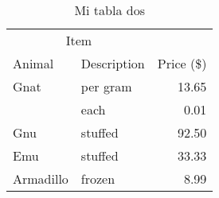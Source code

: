 \lipsum[1-1] \cite{latex2e}

\begin{table}[H]
    \centering
    \begin{tabular}{@{}llr@{}}
        \toprule
        \multicolumn{2}{c}{Item} &                          \\ \cmidrule(r){1-2}
        Animal                   & Description & Price (\$) \\ \midrule
        Gnat                     & per gram    & 13.65      \\
                                 & each        & 0.01       \\
        Gnu                      & stuffed     & 92.50      \\
        Emu                      & stuffed     & 33.33      \\
        Armadillo                & frozen      & 8.99       \\ \bottomrule
    \end{tabular}
    \caption{Mi tabla dos}
    \label{tab:tabla2}
\end{table}
